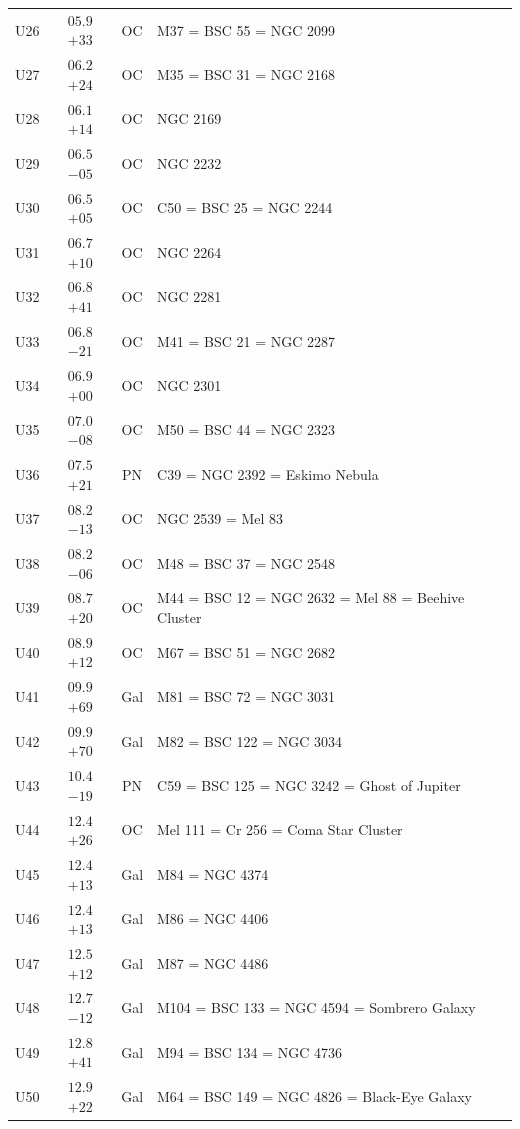 \begin{table}[t]
\begin{tabularx}{\linewidth}{lccX}
U26  &$05.9$ $+33$&OC &M37 = BSC 55 = NGC 2099\\
U27  &$06.2$ $+24$&OC &M35 = BSC 31 = NGC 2168\\
U28  &$06.1$ $+14$&OC &NGC 2169\\
U29  &$06.5$ $-05$&OC &NGC 2232\\
U30  &$06.5$ $+05$&OC &C50 = BSC 25 = NGC 2244\\
U31  &$06.7$ $+10$&OC &NGC 2264\\
U32  &$06.8$ $+41$&OC &NGC 2281\\
U33  &$06.8$ $-21$&OC &M41 = BSC 21 = NGC 2287\\
U34  &$06.9$ $+00$&OC &NGC 2301\\
U35  &$07.0$ $-08$&OC &M50 = BSC 44 = NGC 2323\\
U36  &$07.5$ $+21$&PN &C39 = NGC 2392 = Eskimo Nebula\\
U37  &$08.2$ $-13$&OC &NGC 2539 = Mel 83\\
U38  &$08.2$ $-06$&OC &M48 = BSC 37 = NGC 2548\\
U39  &$08.7$ $+20$&OC &M44 = BSC 12 = NGC 2632 = Mel 88 = Beehive Cluster\\
U40  &$08.9$ $+12$&OC &M67 = BSC 51 = NGC 2682\\
U41  &$09.9$ $+69$&Gal&M81 = BSC 72 = NGC 3031\\
U42  &$09.9$ $+70$&Gal&M82 = BSC 122 = NGC 3034\\
U43  &$10.4$ $-19$&PN &C59 = BSC 125 = NGC 3242 = Ghost of Jupiter\\
U44  &$12.4$ $+26$&OC &Mel 111 = Cr 256 = Coma Star Cluster\\
U45  &$12.4$ $+13$&Gal&M84 = NGC 4374\\
U46  &$12.4$ $+13$&Gal&M86 = NGC 4406\\
U47  &$12.5$ $+12$&Gal&M87 = NGC 4486\\
U48  &$12.7$ $-12$&Gal&M104 = BSC 133 = NGC 4594 = Sombrero Galaxy\\
U49  &$12.8$ $+41$&Gal&M94 = BSC 134 = NGC 4736\\
U50  &$12.9$ $+22$&Gal&M64 = BSC 149 = NGC 4826 = Black-Eye Galaxy\\

        \hline
    \end{tabularx}
\end{table}
\clearpage


